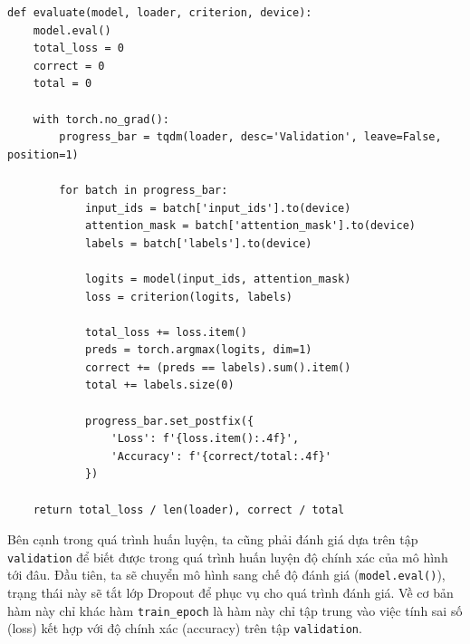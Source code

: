 \begin{lstlisting}[style=pythoncode]
def evaluate(model, loader, criterion, device):
    model.eval()
    total_loss = 0
    correct = 0
    total = 0

    with torch.no_grad():
        progress_bar = tqdm(loader, desc='Validation', leave=False, position=1)

        for batch in progress_bar:
            input_ids = batch['input_ids'].to(device)
            attention_mask = batch['attention_mask'].to(device)
            labels = batch['labels'].to(device)

            logits = model(input_ids, attention_mask)
            loss = criterion(logits, labels)

            total_loss += loss.item()
            preds = torch.argmax(logits, dim=1)
            correct += (preds == labels).sum().item()
            total += labels.size(0)

            progress_bar.set_postfix({
                'Loss': f'{loss.item():.4f}',
                'Accuracy': f'{correct/total:.4f}'
            })
            
    return total_loss / len(loader), correct / total
\end{lstlisting}
Bên cạnh trong quá trình huấn luyện, ta cũng phải đánh giá dựa trên tập \texttt{validation} để biết được trong quá trình huấn luyện độ chính xác của mô hình tới đâu. Đầu
tiên, ta sẽ chuyển mô hình sang chế độ đánh giá (\texttt{model.eval()}), trạng thái này sẽ tắt lớp Dropout để phục vụ cho quá trình đánh giá. Về cơ bản hàm này chỉ khác hàm
\texttt{train\_epoch} là hàm này chỉ tập trung vào việc tính sai số (loss) kết hợp với độ chính xác (accuracy) trên tập \texttt{validation}.

